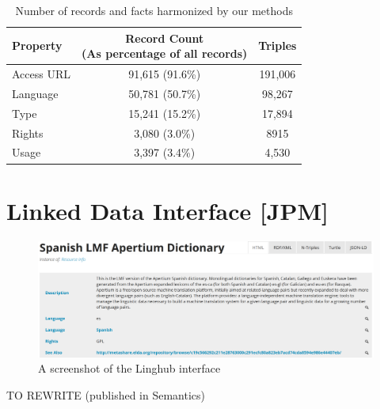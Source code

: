 \documentclass[smallextended]{svjour3}       %
\begin{document}
\begin{table}
    \begin{tabular}{l|cc}
        Property   &  \thead{Record Count\\(As percentage of all records)} & Triples \\
        \hline
        Access URL &  91,615 (91.6\%) & 191,006  \\
        Language   &  50,781 (50.7\%) & 98,267   \\
        Type       &  15,241 (15.2\%) & 17,894   \\
        Rights     &   3,080 (3.0\%)  & 8915     \\
        Usage      &   3,397 (3.4\%)  & 4,530    \\ 
    \end{tabular}
    \caption{\label{tab:total}Number of records and facts harmonized by our
    methods}
\end{table}
        



\section{Linked Data Interface [JPM]}
\label{linked-data-interface}


\begin{figure}
\includegraphics[width=\textwidth]{linghub-screenshot.png}
\caption{A screenshot of the Linghub interface\label{fig:screenshot}}
\end{figure}

TO REWRITE (published in Semantics)
\end{document}

